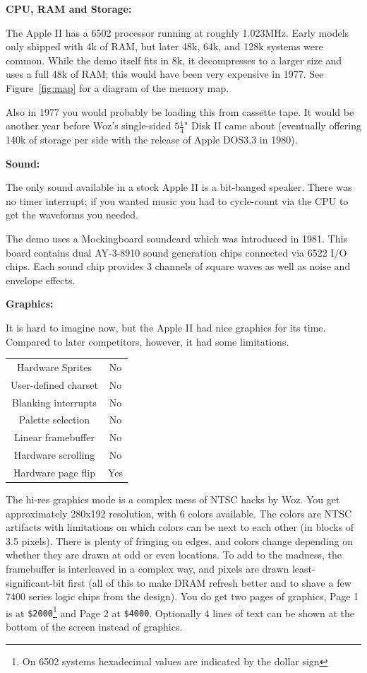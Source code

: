 \documentclass[twocolumn]{article}
\begin{document}
\vspace{1ex}
\noindent
{\bf CPU, RAM and Storage:}

The Apple II has a 6502 processor running at roughly 1.023MHz.
Early models only shipped with 4k of RAM, but later 48k, 64k, and 128k
systems were common.
While the demo itself fits in 8k, it decompresses to a larger size and uses
a full 48k of RAM;
this would have been very expensive in 1977.
See Figure~\ref{fig:map} for a diagram of the memory map.

Also in 1977 you would probably be loading this from cassette tape.
It would be another year before Woz's single-sided
$5\frac{1}{4}$" Disk II came about (eventually offering 140k of
storage per side with the release of Apple DOS3.3 in 1980). 
	
\vspace{1ex}
\noindent
{\bf Sound:}

The only sound available in a stock Apple II is a bit-banged speaker.
There was no timer interrupt; if you wanted music you had to cycle-count
via the CPU to get the waveforms you needed.

The demo uses a Mockingboard soundcard which was introduced in 1981.
This board contains dual AY-3-8910 sound generation chips connected via
6522 I/O chips.
Each sound chip provides 3 channels of square waves as well as noise and
envelope effects.

\vspace{1ex}
\noindent
{\bf Graphics:}

It is hard to imagine now, but the Apple II had nice graphics for its time.
Compared to later competitors, however, it had some limitations.

\begin{center}
\begin{tabular}{|c|c|}
\hline
Hardware Sprites     &	No \\
User-defined charset &	No \\
Blanking interrupts  &	No \\
Palette selection    &	No \\
Linear framebuffer   &	No \\
Hardware scrolling   &	No \\
Hardware page flip   &	Yes \\
\hline
\end{tabular}
\end{center}

The hi-res graphics mode is a complex mess of NTSC hacks by Woz.
You get approximately 280x192 resolution, with 6 colors available.
The colors are NTSC artifacts with limitations 
on which colors can be next to each other (in blocks of 3.5 pixels).
There is plenty of fringing on edges, and colors change depending on
whether they are drawn at odd or even locations.
To add to the madness, the framebuffer is interleaved in a complex way,
and pixels are drawn least-significant-bit first (all of this to make
DRAM refresh better and to shave a few 7400 series logic chips from the design).
You do get two pages of graphics, Page 1 is at
{\tt \$2000}\footnote{On 6502 systems hexadecimal values are 
indicated by the dollar sign}
and Page 2 at {\tt \$4000}.
Optionally 4 lines of text can be shown at the bottom of the
screen instead of graphics.
\end{document}

